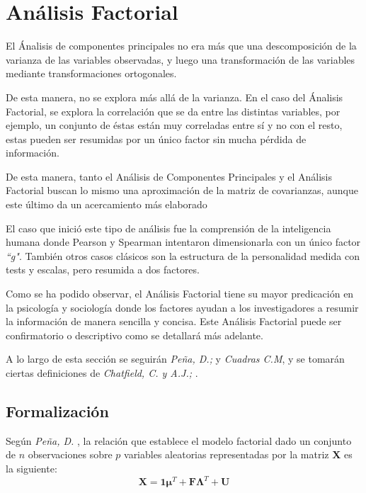 \section{Análisis Factorial}
\noindent El Ánalisis de componentes principales no era más que una descomposición de la varianza de las variables observadas, y luego una transformación de las variables mediante transformaciones ortogonales. 

\noindent De esta manera, no se explora más allá de la varianza. En el caso del Ánalisis Factorial, se explora la correlación que se da entre las distintas variables, por ejemplo, un conjunto de éstas están muy correladas entre sí y no con el resto, estas pueden ser resumidas por un único factor sin mucha pérdida de información. 

\noindent De esta manera, tanto el Análisis de Componentes Principales y el Análisis Factorial buscan lo mismo una aproximación de la matriz de covarianzas, aunque este último da un acercamiento más elaborado 

\noindent El caso que inició este tipo de análisis fue la comprensión de la inteligencia humana donde Pearson y Spearman intentaron dimensionarla con un único factor \emph{``g"}. También otros casos clásicos son la estructura de la personalidad medida con tests y escalas, pero resumida a dos factores. 

\noindent Como se ha podido observar, el Análisis Factorial tiene su mayor predicación en la psicología y sociología donde los factores ayudan a los investigadores a resumir la información de manera sencilla y concisa. Este Análisis Factorial puede ser confirmatorio o descriptivo como se detallará más adelante. 

\noindent A lo largo de esta sección se seguirán \emph{Peña, D.;}\cite{Peña 2002} y \emph{Cuadras C.M}\cite{Cuadras 2014}, y  se tomarán ciertas definiciones de \emph{Chatfield, C. y A.J.;} \cite{Chatfield 1989}. 

\subsection{Formalización}
\noindent Según \emph{Peña, D.} \cite{Peña 2002}, la relación que establece el modelo factorial dado un conjunto de $n$ observaciones sobre $p$ variables aleatorias representadas por la matriz \textbf{X} es la siguiente:
\begin{equation}\label{Eq. Factorial}
\textbf{X}=\textbf{1}\mathbf{\mu}^T+\textbf{F}\mathbf{\Lambda}^T+\textbf{U}
\end{equation}

